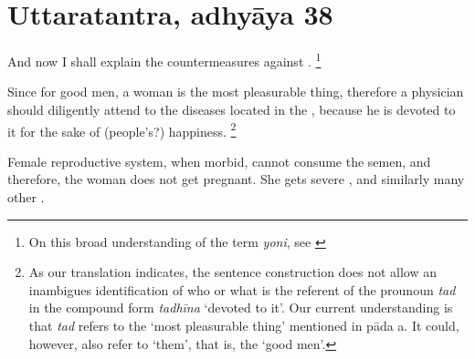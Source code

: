 
\section{Uttaratantra, adhyāya 38}

\begin{translation}

\item [1] And now I shall explain the countermeasures against .%
	\footnote{%
	On this broad understanding of the term \textit{yoni}, see \cite[pp.\ 572--5]{das-orig}}

\item [2] Since for good men, a woman is the most pleasurable thing, therefore a physician should diligently attend to the diseases located in the , because he is devoted to it for the sake of (people's?) happiness.%
	\footnote{%
	As our translation indicates, the sentence construction does not allow an inambigues identification of who or what is the referent of the prounoun \textit{tad} in the compound form \textit{tadhīna} ‘devoted to it’. Our current understanding is that \textit{tad} refers to the ‘most pleasurable thing’ mentioned in pāda a. It could, however, also refer to ‘them’, that is, the ‘good men’.%
	}

\item [3] Female reproductive system, when morbid, cannot consume the semen, and therefore, the woman does not get pregnant. She gets severe ,  and similarly many other .


\end{translation}
